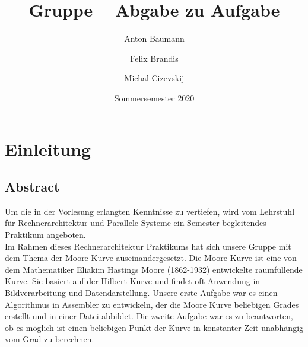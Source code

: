 \documentclass[course=erap]{aspdoc}
\author{Anton Baumann \and Felix Brandis \and Michal Cizevskij}
\date{Sommersemester 2020}  %
\title{Gruppe \theGroup{} -- Abgabe zu Aufgabe \theNumber}
\begin{document}
\maketitle

\section{Einleitung}
\subsection{Abstract}
Um die in der Vorlesung erlangten Kenntnisse zu vertiefen, wird vom Lehrstuhl für Rechnerarchitektur und Parallele Systeme ein Semester begleitendes Praktikum angeboten.\\
Im Rahmen dieses Rechnerarchitektur Praktikums hat sich unsere Gruppe mit dem Thema der Moore Kurve auseinandergesetzt. Die Moore Kurve ist eine von dem Mathematiker Eliakim Hastings Moore (1862-1932) entwickelte raumfüllende Kurve. Sie basiert auf der Hilbert Kurve und findet oft Anwendung in Bildverarbeitung und Datendarstellung. Unsere erste Aufgabe war es einen Algorithmus in Assembler zu entwickeln, der die Moore Kurve beliebigen Grades erstellt und in einer Datei abbildet. Die zweite Aufgabe war es zu beantworten, ob es möglich ist einen beliebigen Punkt der Kurve in konstanter Zeit unabhängig vom Grad zu berechnen.
\end{document}
